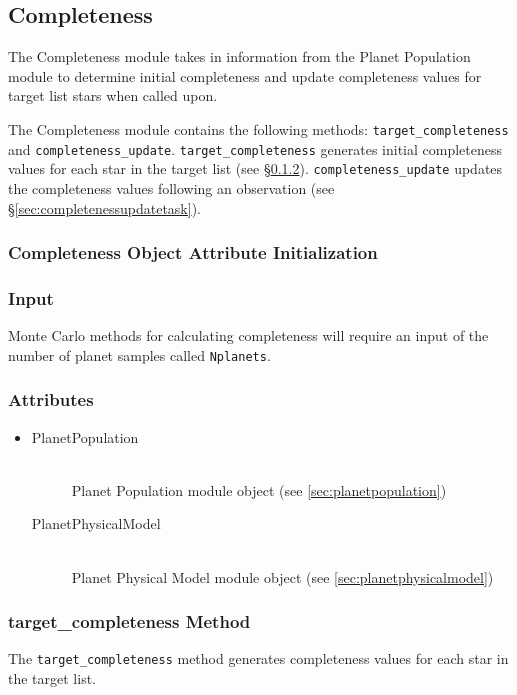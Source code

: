 \documentclass[cleanfoot]{asme2ej}
\begin{document}

\subsection{Completeness}\label{sec:completeness}
The Completeness module takes in information from the Planet Population module to determine initial completeness and update completeness values for target list stars when called upon.

The Completeness module contains the following methods: \verb+target_completeness+ and \verb+completeness_update+. \verb+target_completeness+ generates initial completeness values for each star in the target list (see \S\ref{sec:targetcompletenesstask}). \verb+completeness_update+ updates the completeness values following an observation (see \S\ref{sec:completenessupdatetask}).

\subsubsection{Completeness Object Attribute Initialization}

\subsubsection*{Input}
Monte Carlo methods for calculating completeness will require an input of the number of planet samples called \verb+Nplanets+. 


\subsubsection*{Attributes}
\begin{itemize}
    \item 
    \begin{description}
        \item[PlanetPopulation] \hfill \\
        Planet Population module object (see \ref{sec:planetpopulation})
        \item[PlanetPhysicalModel] \hfill \\
        Planet Physical Model module object (see \ref{sec:planetphysicalmodel}) 
    \end{description}
\end{itemize}

\subsubsection{target\_completeness Method}
\label{sec:targetcompletenesstask}
The \verb+target_completeness+ method generates completeness values for each star in the target list.
\end{document}

